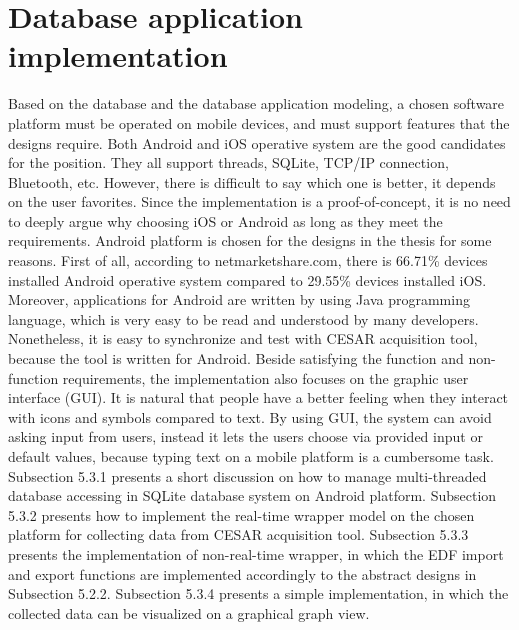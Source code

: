 \section{Database application implementation}
Based on the database and the database application modeling, a chosen software platform must be operated on mobile devices, and must support features that the designs require. Both Android and iOS operative system are the good candidates for the position. They all support threads, SQLite, TCP/IP connection, Bluetooth, etc. However, there is difficult to say which one is better, it depends on the user favorites. Since the implementation is a proof-of-concept, it is no need to deeply argue why choosing iOS or Android as long as they meet the requirements. Android platform is chosen for the designs in the thesis for some reasons. First of all, according to netmarketshare.com\cite{NETMARKETSHARE}, there is 66.71\% devices installed Android operative system compared to 29.55\% devices installed iOS. Moreover, applications for Android are written by using Java programming language, which is very easy to be read and understood by many developers. Nonetheless, it is easy to synchronize and test with CESAR acquisition tool, because the tool is written for Android.
Beside satisfying the function and non-function requirements, the implementation also focuses on the graphic user interface (GUI). It is natural that people have a better feeling when they interact with icons and symbols compared to text. By using GUI, the system can avoid asking input from users, instead it lets the users choose via provided input or default values, because typing text on a mobile platform is a cumbersome task.\\
Subsection 5.3.1 presents a short discussion on how to manage multi-threaded database accessing in SQLite database system on Android platform. Subsection 5.3.2 presents how to implement the real-time wrapper model on the chosen platform for collecting data from CESAR acquisition tool. Subsection 5.3.3 presents the implementation of non-real-time wrapper, in which the EDF import and export functions are implemented accordingly to the abstract designs in Subsection 5.2.2. Subsection 5.3.4 presents a simple implementation, in which the collected data can be visualized on a graphical graph view.
